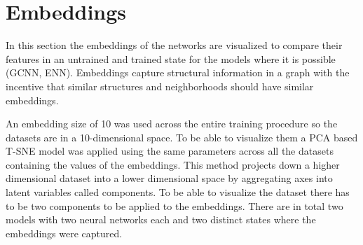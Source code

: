 \documentclass[
]{elteikthesis}[2023/04/10]
\begin{document}
\section{Embeddings}

In this section the embeddings of the networks are visualized to compare
their features in an untrained and trained state for the models where
it is possible (GCNN, ENN). Embeddings capture structural information
in a graph with the incentive that similar structures and neighborhoods
should have similar embeddings. 

An embedding size of 10 was used across the entire training procedure
so the datasets are in a 10-dimensional space. To be able to visualize
them a PCA based T-SNE model was applied using the same parameters
across all the datasets containing the values of the embeddings. This
method projects down a higher dimensional dataset into a lower dimensional
space by aggregating axes into latent variables called components.
To be able to visualize the dataset there has to be two components
to be applied to the embeddings. There are in total two models with
two neural networks each and two distinct states where the embeddings
were captured.
\end{document}
